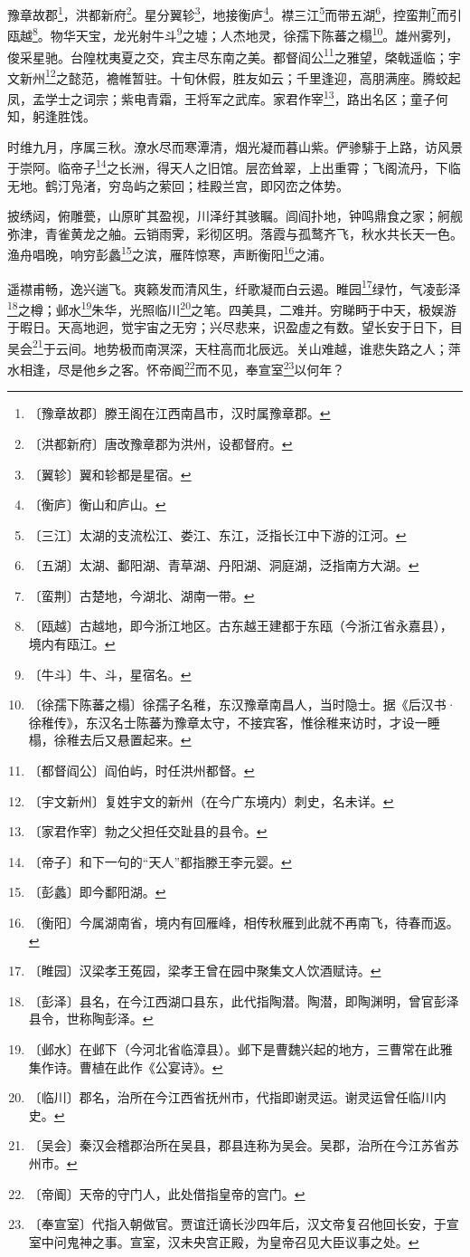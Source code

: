 \documentclass[12pt,UTF-8,openany]{ctexbook}
\begin{document}
\begin{normalsize}
    
    豫章故郡\footnote{〔豫章故郡〕滕王阁在江西南昌市，汉时属豫章郡。}，洪都新府\footnote{〔洪都新府〕唐改豫章郡为洪州，设都督府。}。星分翼轸\footnote{〔翼轸〕翼和轸都是星宿。}，地接衡庐\footnote{〔衡庐〕衡山和庐山。}。襟三江\footnote{〔三江〕太湖的支流松江、娄江、东江，泛指长江中下游的江河。}而带五湖\footnote{〔五湖〕太湖、鄱阳湖、青草湖、丹阳湖、洞庭湖，泛指南方大湖。}，控蛮荆\footnote{〔蛮荆〕古楚地，今湖北、湖南一带。}而引瓯越\footnote{〔瓯越〕古越地，即今浙江地区。古东越王建都于东瓯（今浙江省永嘉县），境内有瓯江。}。物华天宝，龙光射牛斗\footnote{〔牛斗〕牛、斗，星宿名。}之墟；人杰地灵，徐孺下陈蕃之榻\footnote{〔徐孺下陈蕃之榻〕徐孺子名稚，东汉豫章南昌人，当时隐士。据《后汉书·徐稚传》，东汉名士陈蕃为豫章太守，不接宾客，惟徐稚来访时，才设一睡榻，徐稚去后又悬置起来。}。雄州雾列，俊采星驰。台隍枕夷夏之交，宾主尽东南之美。都督阎公\footnote{〔都督阎公〕阎伯屿，时任洪州都督。}之雅望，棨戟遥临；宇文新州\footnote{〔宇文新州〕复姓宇文的新州（在今广东境内）刺史，名未详。}之懿范，襜帷暂驻。十旬休假，胜友如云；千里逢迎，高朋满座。腾蛟起凤，孟学士之词宗；紫电青霜，王将军之武库。家君作宰\footnote{〔家君作宰〕勃之父担任交趾县的县令。}，路出名区；童子何知，躬逢胜饯。
    
    时维九月，序属三秋。潦水尽而寒潭清，烟光凝而暮山紫。俨骖騑于上路，访风景于崇阿。临帝子\footnote{〔帝子〕和下一句的“天人”都指滕王李元婴。}之长洲，得天人之旧馆。层峦耸翠，上出重霄；飞阁流丹，下临无地。鹤汀凫渚，穷岛屿之萦回；桂殿兰宫，即冈峦之体势。
    
    披绣闼，俯雕甍，山原旷其盈视，川泽纡其骇瞩。闾阎扑地，钟鸣鼎食之家；舸舰弥津，青雀黄龙之舳。云销雨霁，彩彻区明。落霞与孤鹜齐飞，秋水共长天一色。渔舟唱晚，响穷彭蠡\footnote{〔彭蠡〕即今鄱阳湖。}之滨，雁阵惊寒，声断衡阳\footnote{〔衡阳〕今属湖南省，境内有回雁峰，相传秋雁到此就不再南飞，待春而返。}之浦。
    
    遥襟甫畅，逸兴遄飞。爽籁发而清风生，纤歌凝而白云遏。睢园\footnote{〔睢园〕汉梁孝王菟园，梁孝王曾在园中聚集文人饮酒赋诗。}绿竹，气凌彭泽\footnote{〔彭泽〕县名，在今江西湖口县东，此代指陶潜。陶潜，即陶渊明，曾官彭泽县令，世称陶彭泽。}之樽；邺水\footnote{〔邺水〕在邺下（今河北省临漳县）。邺下是曹魏兴起的地方，三曹常在此雅集作诗。曹植在此作《公宴诗》。}朱华，光照临川\footnote{〔临川〕郡名，治所在今江西省抚州市，代指即谢灵运。谢灵运曾任临川内史。}之笔。四美具，二难并。穷睇眄于中天，极娱游于暇日。天高地迥，觉宇宙之无穷；兴尽悲来，识盈虚之有数。望长安于日下，目吴会\footnote{〔吴会〕秦汉会稽郡治所在吴县，郡县连称为吴会。吴郡，治所在今江苏省苏州市。}于云间。地势极而南溟深，天柱高而北辰远。关山难越，谁悲失路之人；萍水相逢，尽是他乡之客。怀帝阍\footnote{〔帝阍〕天帝的守门人，此处借指皇帝的宫门。}而不见，奉宣室\footnote{〔奉宣室〕代指入朝做官。贾谊迁谪长沙四年后，汉文帝复召他回长安，于宣室中问鬼神之事。宣室，汉未央宫正殿，为皇帝召见大臣议事之处。}以何年？
    

\end{normalsize}
\end{document}
